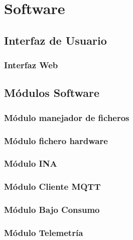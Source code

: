 \section{Software}

\subsection{Interfaz de Usuario}
\subsubsection{Interfaz Web}


\subsection{Módulos Software}
\subsubsection{Módulo manejador de ficheros}\label{subsubsec:ManejadorFicheros}


\subsubsection{Módulo fichero hardware}


\subsubsection{Módulo INA}


\subsubsection{Módulo Cliente MQTT}


\subsubsection{Módulo Bajo Consumo}


\subsubsection{Módulo Telemetría}


